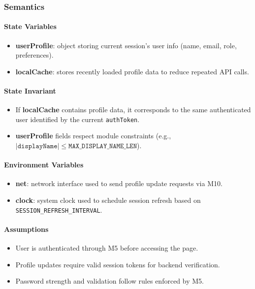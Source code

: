 \documentclass[12pt, titlepage]{article}
\begin{document}
\subsubsection{Semantics}

\paragraph{State Variables}
\begin{itemize}
  \item \textbf{userProfile}: object storing current session’s user info (name, email, role, preferences).
  \item \textbf{localCache}: stores recently loaded profile data to reduce repeated API calls.
\end{itemize}

\paragraph{State Invariant}
\begin{itemize}
  \item If \textbf{localCache} contains profile data, it corresponds to the same authenticated user identified by the current \texttt{authToken}.
  \item \textbf{userProfile} fields respect module constraints (e.g., $|\texttt{displayName}| \le \texttt{MAX\_DISPLAY\_NAME\_LEN}$).
\end{itemize}


\paragraph{Environment Variables}
\begin{itemize}
  \item \textbf{net}: network interface used to send profile update requests via M10.
  \item \textbf{clock}: system clock used to schedule session refresh based on \texttt{SESSION\_REFRESH\_INTERVAL}.
\end{itemize}

\paragraph{Assumptions}
\begin{itemize}
  \item User is authenticated through M5 before accessing the page.
  \item Profile updates require valid session tokens for backend verification.
  \item Password strength and validation follow rules enforced by M5.
\end{itemize}
\end{document}
